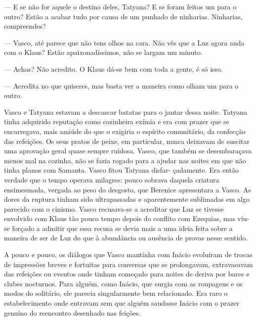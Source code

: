 --- E se não for aquele o destino deles, Tatyana? E se foram feitos um
  para o outro? Estão a acabar tudo por causa de um punhado de
  ninharias. Ninharias, compreendes?

--- Vasco, até parece que não tens olhos na cara. Não vês que a Luz agora
  anda com o Klaus? Estão apaixonadíssimos, não se largam um minuto.

--- Achas? Não acredito. O Klaus dá-se bem com toda a gente, é só isso.

--- Acredita no que quiseres, mas basta ver a maneira como olham um para o
  outro.


Vasco e Tatyana estavam a descascar batatas para o jantar dessa noite.
Tatyana tinha adquirido reputação como cozinheira exímia e era com
prazer que se encarregava, mais amiúde do que o exigiria o espírito
comunitário, da confecção das refeições. Os seus pratos de peixe, em
particular, nunca deixavam de suscitar uma aprovação geral quase sempre
ruidosa. Vasco, que também se desembaraçava menos mal na cozinha, não
se fazia rogado para a ajudar nas noites em que não tinha planos com
Samanta. Vasco fitou Tatyana disfar- çadamente. Era então verdade que o
tempo operava milagres: pouco sobrava daquela criatura ensimesmada,
vergada ao peso do desgosto, que Berenice apresentara a Vasco. As dores
da ruptura tinham sido ultrapassadas e aparentemente sublimadas em
algo parecido com o cinismo. Vasco recusava-se a acreditar que Luz se
tivesse envolvido com Klaus tão pouco tempo depois do conflito com
Ezequias, mas viu-se forçado a admitir que essa recusa se devia mais a
uma ideia feita sobre a maneira de ser de Luz do que à abundância ou
ausência de provas nesse sentido.

A pouco e pouco, os diálogos que Vasco mantinha com Inácio evoluíram de
trocas de impressões breves e fortuitas para conversas que se
prolongavam, extravasavam das refeições ou eventos onde tinham começado
para noites de deriva por bares e clubes nocturnos. Para alguém, como
Inácio, que surgia com as roupagens e os modos do solitário, ele parecia
singularmente bem relacionado. Era raro o estabelecimento onde entravam
sem que alguém saudasse Inácio com o prazer genuíno do reencontro
desenhado nas feições.

